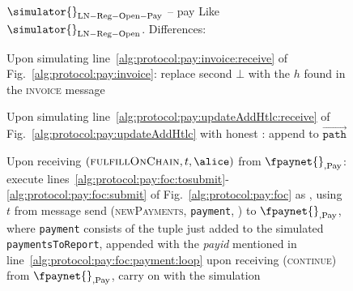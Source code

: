 \begin{figure}[!htbp]
  \begin{simulatorbox}{$\simulator{}_{\mathrm{LN - Reg - Open - Pay}}$ -- pay}
    Like $\simulator{}_{\mathrm{LN - Reg - Open}}$. Differences:
    \begin{algorithmic}[1]
      \State Upon simulating line~\ref{alg:protocol:pay:invoice:receive}
      of Fig.~\ref{alg:protocol:pay:invoice}:
      \Indent
          \State replace second $\bot$ with the $h$ found in the
          \textsc{invoice} message
        \EndIf
      \EndIndent
      \Statex

      \State Upon simulating
      line~\ref{alg:protocol:pay:updateAddHtlc:receive} of
      Fig.~\ref{alg:protocol:pay:updateAddHtlc} with honest \alice:
      \Indent
          \State append \alice{} to $\overrightarrow{\mathtt{path}}$
        \EndIf
      \EndIndent
      \Statex

      \State Upon receiving $\left(\textsc{fulfillOnChain}, t, \alice\right)$
      from $\fpaynet{}_{\mathrm{, Pay}}$:
      \label{alg:sim:pay:foc:top}
      \Indent
        \State execute
        lines~\ref{alg:protocol:pay:foc:tosubmit}-\ref{alg:protocol:pay:foc:submit}
        of Fig.~\ref{alg:protocol:pay:foc} as \alice{}, using $t$ from message
        \label{alg:sim:pay:foc:run}
        \label{alg:sim:foc:report:if}
          \State send (\textsc{newPayments}, \texttt{payment}, \alice) to
          $\fpaynet{}_{\mathrm{, Pay}}$, where \texttt{payment} consists of the
          tuple just added to the simulated \texttt{paymentsToReport}, appended
          with the \textit{payid} mentioned in
          line~\ref{alg:protocol:pay:foc:payment:loop}
          \label{alg:sim:foc:report}
          \State upon receiving (\textsc{continue}) from $\fpaynet{}_{\mathrm{,
          Pay}}$, carry on with the simulation
        \EndIf
      \EndIndent
      \Statex


\end{algorithmic}
\end{simulatorbox}
\end{figure}
